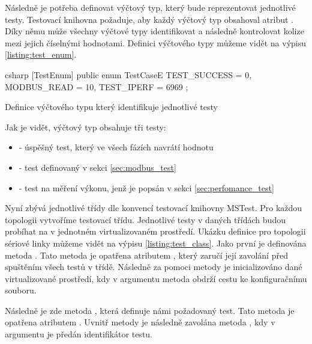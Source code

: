 Následně je potřeba definovat výčtový typ, který bude reprezentovat jednotlivé testy. Testovací knihovna požaduje, aby každý výčtový typ obsahoval atribut . Díky němu může všechny výčtové typy identifikovat a následně kontrolovat kolize mezi jejich číselnými hodnotami. Definici výčtového typy můžeme vidět na výpisu \ref{listing:test_enum}. 

\begin{listing}[htbp]
    \centering
    \begin{cminted}[breaklines,autogobble, fontsize=\small]{csharp}
[TestEnum]
public enum TestCaseE
{
    TEST_SUCCESS = 0,
    MODBUS_READ = 10,
    TEST_IPERF = 6969
};
    \end{cminted}
\caption{Definice výčtového typu který identifikuje jednotlivé testy}
\label{listing:test_enum}
\end{listing}

Jak je vidět, výčtový typ obsahuje tři testy:

\begin{itemize}
    \item {} - úspěšný test, který ve všech fázích navrátí hodnotu 
    \item {} - test definovaný v sekci \ref{sec:modbus_test}
    \item {} - test na měření výkonu, jenž je popsán v sekci \ref{sec:perfomance_test}
\end{itemize}

Nyní zbývá jednotlivé třídy dle konvencí testovací knihovny MSTest. Pro každou topologii vytvoříme testovací třídu. Jednotlivé testy v daných třídách budou probíhat na v jednotném virtualizovaném prostředí. Ukázku definice pro topologii sériové linky můžeme vidět na výpisu \ref{listing:test_class}. Jako první je definována metoda . Tato metoda je opatřena atributem , který zaručí její zavolání před spuštěním všech testů v třídě. Následně za pomoci metody  je inicializováno dané virtualizované prostředí, kdy v argumentu metoda obdrží cestu ke konfiguračnímu souboru.

Následně je zde metoda , která definuje námi požadovaný test. Tato metoda je opatřena atributem . Uvnitř metody je následně zavolána metoda , kdy v argumentu je předán identifikátor testu. 

